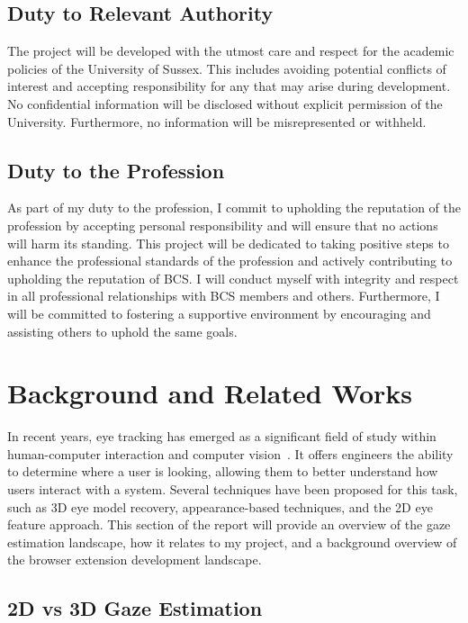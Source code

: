 \documentclass{report}
\begin{document}
\section{Duty to Relevant Authority}   

The project will be developed with the utmost care and respect for the academic policies of the University of Sussex. This includes avoiding potential conflicts of interest and accepting responsibility for any that may arise during development. No confidential information will be disclosed without explicit permission of the University. Furthermore, no information will be misrepresented or withheld. 

\section{Duty to the Profession}   

As part of my duty to the profession, I commit to upholding the reputation of the profession by accepting personal responsibility and will ensure that no actions will harm its standing. This project will be dedicated to taking positive steps to enhance the professional standards of the profession and actively contributing to upholding the reputation of BCS. I will conduct myself with integrity and respect in all professional relationships with BCS members and others. Furthermore, I will be committed to fostering a supportive environment by encouraging and assisting others to uphold the same goals. 

\chapter{Background and Related Works}
\label{chap:background}
\noindent
In recent years, eye tracking has emerged as a significant field of study within human-computer interaction and computer vision~\cite{cheng2021survey,kar2017review}. It offers engineers the ability to determine where a user is looking, allowing them to better understand how users interact with a system. Several techniques have been proposed for this task, such as 3D eye model recovery, appearance-based techniques, and the 2D eye feature approach. This section of the report will provide an overview of the gaze estimation landscape, how it relates to my project, and a background overview of the browser extension development landscape. 

\section{2D vs 3D Gaze Estimation} 
\end{document}
